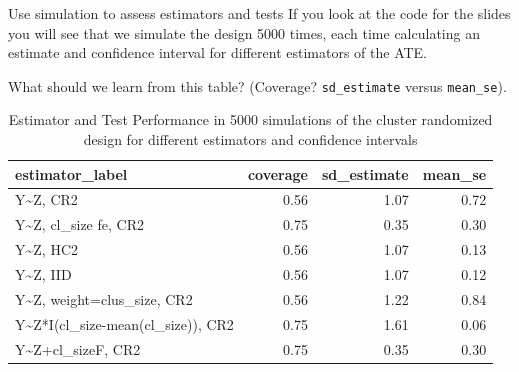 \documentclass[
  ignorenonframetext,
]{beamer}
\begin{document}
\begin{frame}[fragile]{Use simulation to assess estimators and tests}
\protect\hypertarget{use-simulation-to-assess-estimators-and-tests}{}
If you look at the code for the slides you will see that we simulate the
design 5000 times, each time calculating an estimate and confidence
interval for different estimators of the ATE.

What should we learn from this table? (Coverage? \texttt{sd\_estimate}
versus \texttt{mean\_se}).

\scriptsize\normalsize

\scriptsize\normalsize

\scriptsize\normalsize

\scriptsize

\begin{table}

\caption{\label{tab:showresclus1}Estimator and Test Performance in 5000 simulations of the cluster randomized design for different estimators and confidence intervals}
\centering
\begin{tabular}[t]{lrrr}
\toprule
estimator\_label & coverage & sd\_estimate & mean\_se\\
\midrule
Y\textasciitilde{}Z, CR2 & 0.56 & 1.07 & 0.72\\
Y\textasciitilde{}Z, cl\_size fe, CR2 & 0.75 & 0.35 & 0.30\\
Y\textasciitilde{}Z, HC2 & 0.56 & 1.07 & 0.13\\
Y\textasciitilde{}Z, IID & 0.56 & 1.07 & 0.12\\
Y\textasciitilde{}Z, weight=clus\_size, CR2 & 0.56 & 1.22 & 0.84\\
Y\textasciitilde{}Z*I(cl\_size-mean(cl\_size)), CR2 & 0.75 & 1.61 & 0.06\\
Y\textasciitilde{}Z+cl\_sizeF, CR2 & 0.75 & 0.35 & 0.30\\
\bottomrule
\end{tabular}
\end{table}

\normalsize
\end{frame}
\end{document}
